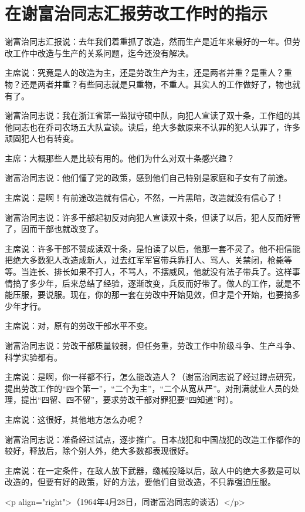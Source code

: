 \section[在谢富治同志汇报劳改工作时的指示（一九六四年四月二十八日）]{在谢富治同志汇报劳改工作时的指示}


谢富治同志汇报说：去年我们着重抓了改造，然而生产是近年来最好的一年。但劳改工作中改造与生产的关系问题，迄今还没有解决。

主席说：究竟是人的改造为主，还是劳改生产为主，还是两者并重？是重人？重物？还是两者并重？有些同志就是只重物，不重人。其实人的工作做好了，物也就有了。

谢富治同志说：我在浙江省第一监狱守硕中队，向犯人宣读了双十条，工作组的其他同志也在乔司农场五大队宣读。读后，绝大多数原来不认罪的犯人认罪了，许多顽固犯人也有转变。

主席：大概那些人是比较有用的。他们为什么对双十条感兴趣？

谢富治同志说：他们懂了党的政策，感到他们自己特别是家庭和子女有了前途。

主席说：是啊！有前途改造就有信心，不然，一片黑暗，改造就没有信心了！

谢富治同志说：许多干部起初反对向犯人宣读双十条，但读了以后，犯人反而好管了，因而干部也就改变了。

主席说：许多干部不赞成读双十条，是怕读了以后，他那一套不灵了。他不相信能把绝大多数犯人改造成新人，过去红军军官带兵靠打人、骂人、关禁闭，枪毙等等。当连长、排长如果不打人，不骂人，不摆威风，他就没有法子带兵了。这样事情搞了多少年，后来总结了经验，逐渐改变，兵反而好带了。做人的工作，就是不能压服，要说服。现在，你的那一套在劳改中开始见效，但才是个开始，也要搞多少年才行。

主席说：对，原有的劳改干部水平不变。

谢富治同志说：劳改干部质量较弱，但任务重，劳改工作中阶级斗争、生产斗争、科学实验都有。

主席说：是啊，你一样都不行，怎么能改造人？（谢富治同志说了经过蹲点研究，提出劳改工作的“四个第一”，“二个为主”，“二个从宽从严”。对刑满就业人员的处理，提出“四留、四不留”，要求劳改干部对罪犯要“四知道”时）。

主席说：这很好，其他地方怎么办呢？

谢富治同志说：准备经过试点，逐步推广。日本战犯和中国战犯的改造工作都作的较好，释放后，除个别人外，绝大多数都表现很好。

主席说：在一定条件，在敌人放下武器，缴械投降以后，敌人中的绝大多数是可以改造的，但要有好的政策，好的方法，要他们自觉改造，不只靠强迫压服。

<p align="right">（1964年4月28日，同谢富治同志的谈话）</p>


